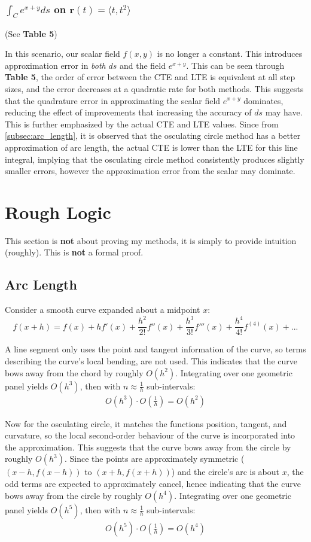 \documentclass{article}
\begin{document}
\subsubsection{$\int_{C}e^{x+y}ds$ on $\mathbf{r}(t)=\langle t, t^2\rangle$}
(See \textbf{Table 5})

In this scenario, our scalar field $f(x,y)$ is no longer a constant. This introduces approximation error in \textit{both} $ds$ and the field $e^{x+y}$. This can be seen through \textbf{Table 5}, the order of error between the CTE and LTE is equivalent at all step sizes, and the error decreases at a quadratic rate for both methods. This suggests that the quadrature error in approximating the scalar field $e^{x+y}$ dominates, reducing the effect of improvements that increasing the accuracy of $ds$ may have. This is further emphasized by the actual CTE and LTE values. Since from \ref{subsec:arc_length}, it is observed that the osculating circle method has a better approximation of arc length, the actual CTE is lower than the LTE for this line integral, implying that the osculating circle method consistently produces slightly smaller errors, however the approximation error from the scalar may dominate.
\newpage

\section{Rough Logic}
This section is \textbf{not} about proving my methods, it is simply to provide intuition (roughly). This is \textbf{not} a formal proof.
\subsection{Arc Length}
\label{subsec:arc_length_logic}
Consider a smooth curve expanded about a midpoint $x$:
\[
f(x+h) = f(x) + hf'(x) + \frac{h^2}{2!}f''(x) + \frac{h^3}{3!}f'''(x) + \frac{h^4}{4!}f^{(4)}(x) + ...
\]

A line segment only uses the point and tangent information of the curve, so terms describing the curve's local bending, are not used. This indicates that the curve bows away from the chord by roughly $O(h^2)$. Integrating over one geometric panel yields $O(h^3)$, then with $n \approx \frac{1}{h}$ sub-intervals:
\begin{gather*}
O(h^3) \cdot O(\frac{1}{h}) = O(h^2)
\end{gather*}

Now for the osculating circle, it matches the functions position, tangent, and curvature, so the local second-order behaviour of the curve is incorporated into the approximation. This suggests that the curve bows away from the circle by roughly $O(h^3)$. Since the points are approximately symmetric ($(x-h,f(x-h))$ to $(x+h, f(x+h))$) and the circle's arc is about $x$, the odd terms are expected to approximately cancel, hence indicating that the curve bows away from the circle by roughly $O(h^4)$. Integrating over one geometric panel yields $O(h^5)$, then with $n \approx \frac{1}{h}$ sub-intervals:
\begin{gather*}
O(h^5) \cdot O(\frac{1}{h}) = O(h^4)
\end{gather*}
\end{document}

